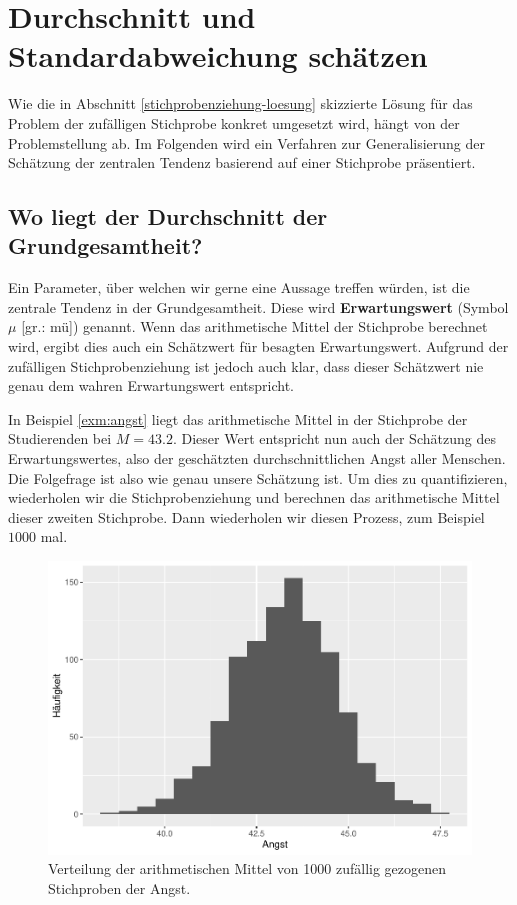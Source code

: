 \documentclass[
]{book}
\theoremstyle{definition}
\theoremstyle{definition}
\theoremstyle{definition}
\theoremstyle{definition}
\theoremstyle{remark}
\begin{document}
\chapter{Durchschnitt und Standardabweichung schätzen}\label{durchschnitt-und-standardabweichung-schuxe4tzen}

Wie die in Abschnitt \ref{stichprobenziehung-loesung} skizzierte Lösung für das Problem der zufälligen Stichprobe konkret umgesetzt wird, hängt von der Problemstellung ab. Im Folgenden wird ein Verfahren zur Generalisierung der Schätzung der zentralen Tendenz
basierend auf einer Stichprobe präsentiert.

\section{Wo liegt der Durchschnitt der Grundgesamtheit?}\label{wo-liegt-der-durchschnitt-der-grundgesamtheit}

Ein Parameter, über welchen wir gerne eine Aussage treffen würden, ist die zentrale Tendenz in der Grundgesamtheit. \label{customdef-erwartungswert}{Diese wird \textbf{Erwartungswert} (Symbol \(\mu\) {[}gr.: mü{]}) genannt.} Wenn das arithmetische Mittel der Stichprobe berechnet wird, ergibt dies auch ein Schätzwert für besagten Erwartungswert. Aufgrund der zufälligen Stichprobenziehung ist jedoch auch klar, dass dieser Schätzwert nie genau dem wahren Erwartungswert entspricht.

In Beispiel \ref{exm:angst} liegt das arithmetische Mittel in der Stichprobe der Studierenden bei \(M=43.2\). Dieser Wert entspricht nun auch der Schätzung des Erwartungswertes, also der geschätzten durchschnittlichen Angst aller Menschen. Die Folgefrage ist also wie genau unsere Schätzung ist. Um dies zu quantifizieren, wiederholen wir die Stichprobenziehung und berechnen das arithmetische Mittel dieser zweiten Stichprobe. Dann wiederholen wir diesen Prozess, zum Beispiel \(1000\) mal.

\begin{figure}
\centering
\includegraphics{aps_statistik1_files/figure-latex/exm-angst-hist-means-1.pdf}
\caption{\label{fig:exm-angst-hist-means}Verteilung der arithmetischen Mittel von 1000 zufällig gezogenen Stichproben der Angst.}
\end{figure}
\end{document}
